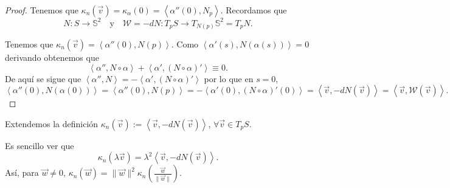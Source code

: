 \begin{proof}
Tenemos que $\displaystyle \kappa_{n}\left(\vec{v}\right)=\kappa_{\alpha }\left(0\right)=\left\langle \alpha''\left(0\right), N_{p} \right\rangle  $. Recordamos que
\[N : S \to \mathbb{S}^{2} \quad \text{y} \quad \mathcal{W} = - dN : T_{p}S \to T_{N\left(p\right)}\mathbb{S}^{2} = T_{p}N .\]

Tenemos que $\displaystyle \kappa_{n}\left(\vec{v}\right)=\left\langle \alpha''\left(0\right), N\left(p\right) \right\rangle  $. Como $\displaystyle \left\langle \alpha'\left(s\right), N\left(\alpha\left(s\right)\right) \right\rangle = 0 $ derivando obtenemos que
\[\left\langle \alpha'', N\circ \alpha \right\rangle + \left\langle \alpha', \left(N\circ \alpha \right)' \right\rangle \equiv 0 .\]
De aquí se sigue que $\displaystyle \left\langle \alpha'', N \right\rangle =-\left\langle \alpha', \left(N\circ \alpha \right)' \right\rangle  $ por lo que en $\displaystyle s=0  $,
\[\left\langle \alpha''\left(0\right), N\left(\alpha\left(0\right)\right) \right\rangle = \left\langle \alpha''\left(0\right), N\left(p\right) \right\rangle =-\left\langle \alpha'\left(0\right), \left(N\circ \alpha \right)'\left(0\right) \right\rangle =\left\langle \vec{v}, -dN\left(\vec{v}\right) \right\rangle =\left\langle \vec{v}, \mathcal{W}\left(\vec{v}\right) \right\rangle  .\]
\end{proof}
\begin{definition}
Extendemos la definición $\displaystyle \kappa_{n}\left(\vec{v}\right):=\left\langle \vec{v},-dN\left(\vec{v}\right) \right\rangle  $, $\displaystyle \forall \vec{v}\in T_{p}S $.
\end{definition}
\begin{observation}
Es sencillo ver que 
\[\kappa_{n}\left(\lambda \vec{v}\right)=\lambda^{2}\left\langle \vec{v},-dN\left(\vec{v}\right) \right\rangle  .\]
Así, para $\displaystyle \vec{w}\neq 0 $, $\displaystyle \kappa_{n}\left(\vec{w}\right)=\|\vec{w}\|^{2}\kappa_{n}\left(\frac{\vec{w}}{\|\vec{w}\|}\right) $. 
\end{observation}

